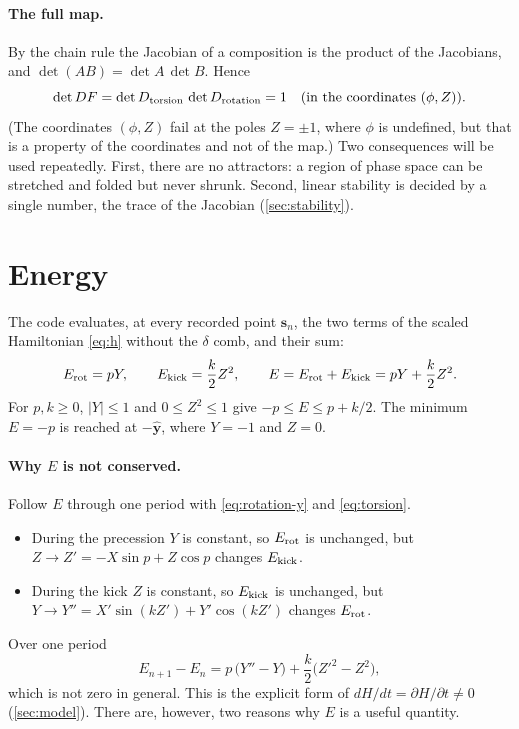 \documentclass[11pt,a4paper]{article}
\newcommand{\vs}{\bm{s}}
\begin{document}
\paragraph{The full map.} By the chain rule the Jacobian of a composition is the product of the Jacobians, and
$\det(AB) = \det A\,\det B$. Hence
\begin{equation}
  \det DF = \det D_{\rm torsion}\,\det D_{\rm rotation} = 1 \quad\text{(in the coordinates $(\phi,Z)$)}.
\end{equation}
(The coordinates $(\phi,Z)$ fail at the poles $Z=\pm1$, where $\phi$ is undefined, but that is a property of the
coordinates and not of the map.) Two consequences will be used repeatedly. First, there are no attractors: a region of
phase space can be stretched and folded but never shrunk. Second, linear stability is decided by a single number,
the trace of the Jacobian (\cref{sec:stability}).

\section{Energy}\label{sec:energy}

The code evaluates, at every recorded point $\vs_n$, the two terms of the scaled Hamiltonian \eqref{eq:h} without the
$\delta$ comb, and their sum:
\begin{equation}\label{eq:energy}
  E_{\rm rot} = pY, \qquad E_{\rm kick} = \frac{k}{2}Z^2, \qquad E = E_{\rm rot} + E_{\rm kick} = pY + \frac{k}{2}Z^2 .
\end{equation}
For $p, k \ge 0$, $|Y|\le1$ and $0\le Z^2\le1$ give $-p \le E \le p + k/2$. The minimum $E = -p$ is reached at
$-\hat{\bm y}$, where $Y=-1$ and $Z=0$.

\paragraph{Why $E$ is not conserved.} Follow $E$ through one period with \eqref{eq:rotation-y} and \eqref{eq:torsion}.
\begin{itemize}
  \item During the precession $Y$ is constant, so $E_{\rm rot}$ is unchanged, but $Z \to Z' = -X\sin p + Z\cos p$
  changes $E_{\rm kick}$.
  \item During the kick $Z$ is constant, so $E_{\rm kick}$ is unchanged, but $Y \to Y'' = X'\sin(kZ') + Y'\cos(kZ')$
  changes $E_{\rm rot}$.
\end{itemize}
Over one period
\begin{equation*}
  E_{n+1} - E_n = p\,\big(Y'' - Y\big) + \frac k2\big(Z'^2 - Z^2\big),
\end{equation*}
which is not zero in general. This is the explicit form of $dH/dt = \partial H/\partial t \ne 0$
(\cref{sec:model}). There are, however, two reasons why $E$ is a useful quantity.
\end{document}
